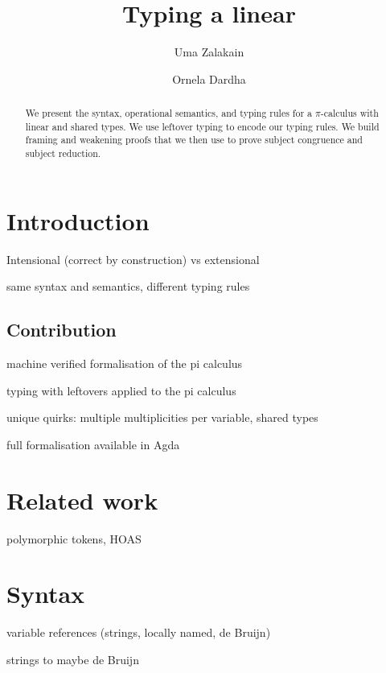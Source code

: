 \documentclass[a4paper,UKenglish,cleveref, autoref, thm-restate,authorcolumns]{lipics-v2019}
\title{Typing a linear \picalc}
\author{Uma Zalakain}{University of Glasgow, Scotland}
       {uma.zalakain.1@research.gla.ac.uk}{https://orcid.org/0000-0002-3268-9338}{}
\author{Ornela Dardha}{University of Glasgow, Scotland}
       {ornela.dardha@glasgow.ac.uk}{https://orcid.org/0000-0001-9927-7875}{}
\newcommand{\picalc}{$\pi$-calculus}
\begin{document}
\maketitle

\begin{abstract}
  We present the syntax, operational semantics, and typing rules for a \picalc{} with linear and shared types. We use leftover typing \cite{} to encode our typing rules. We build framing and weakening proofs that we then use to prove subject congruence and subject reduction.
\end{abstract}

\section{Introduction}

Intensional (correct by construction) vs extensional

same syntax and semantics, different typing rules

\subsection{Contribution}

machine verified formalisation of the pi calculus

typing with leftovers applied to the pi calculus

unique quirks: multiple multiplicities per variable, shared types

full formalisation available in Agda

\section{Related work}

\cite{previous-work} polymorphic tokens, HOAS

\cite{typing-with-leftovers}

\section{Syntax}

variable references (strings, locally named, de Bruijn)

strings to maybe de Bruijn
\end{document}
